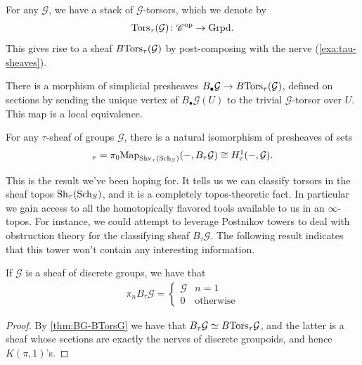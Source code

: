 \documentclass[11pt,openany]{book}
\begin{document}
\begin{example}
For any $\mathcal{G}$, we have a stack of $\mathcal{G}$-torsors, which we denote by
\begin{align*}
    \mathrm{Tors}_\tau(\mathcal{G}) \colon \mathscr{C}^{\mathrm{op}} \to \mathrm{Grpd}.
\end{align*}
This gives rise to a sheaf $B\mathrm{Tors}_\tau(\mathcal{G})$ by post-composing with the nerve (\autoref{exa:tau-sheaves}).
\end{example}

\begin{theorem}\label{thm:BG-BTorsG} 
\cite[2.3.2]{AHW2}
There is a morphism of simplicial presheaves $B_\bullet \mathcal{G} \to B\mathrm{Tors}_\tau(\mathcal{G})$, defined on sections by sending the unique vertex of $B_\bullet \mathcal{G}(U)$ to the trivial $\mathcal{G}$-torsor over $U$. This map is a local equivalence.
\end{theorem}

\begin{corollary}\label{cor:BG-representability-sheaf-topos} 
For any $\tau$-sheaf of groups $\mathcal{G}$, there is a natural isomorphism of presheaves of sets
\begin{align*}
    [-, B_\tau \mathcal{G}]_\tau = \pi_0 \Map_{\Shv_\tau(\Sch_S)}(-,B_\tau \mathcal{G}) \cong H^1_\tau(-,\mathcal{G}).
\end{align*}
\end{corollary}

This is the result we've been hoping for. It tells us we can classify torsors in the sheaf topos $\mathrm{Sh}_\tau(\mathrm{Sch}_S)$, and it is a completely topos-theoretic fact. In particular we gain access to all the homotopically flavored tools available to us in an $\infty$-topos. For instance, we could attempt to leverage Postnikov towers to deal with obstruction theory for the classifying sheaf $B_\tau \mathcal{G}$. The following result indicates that this tower won't contain any interesting information.

\begin{example} If $\mathcal{G}$ is a sheaf of discrete groups, we have that
\begin{align*}
    \pi_n B_\tau \mathcal{G} = \begin{cases}
    \mathcal{G} & n=1 \\
    0 & \text{otherwise}
    \end{cases}
\end{align*}
\end{example}
\begin{proof} By \autoref{thm:BG-BTorsG} we have that $B_\tau \mathcal{G} \simeq B\mathrm{Tors}_\tau \mathcal{G}$, and the latter is a sheaf whose sections are exactly the nerves of discrete groupoids, and hence $K(\pi,1)$'s.
\end{proof}
\end{document}
